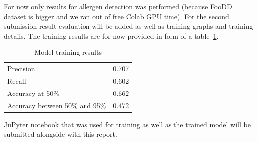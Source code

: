 \documentclass[10pt,twocolumn,letterpaper]{article}
\begin{document}
For now only results for allergen detection was performed (because FooDD dataset is bigger and we ran out of free Colab GPU time).
For the second submission result evaluation will be added as well as training graphs and training details.
The training results are for now provided in form of a table~\ref{results-table}.

\begin{table}[!h]
    \begin{center}
        \caption{Model training results}\label{results-table}
        \begin{tabular}{ l c }
            \toprule
            Precision & 0.707 \\
            Recall & 0.602 \\
            Accuracy at 50\% & 0.662 \\
            Accuracy between 50\% and 95\% & 0.472 \\
            \bottomrule
        \end{tabular}
    \end{center}
\end{table}

JuPyter notebook that was used for training as well as the trained model will be submitted alongside with this report.
\end{document}
